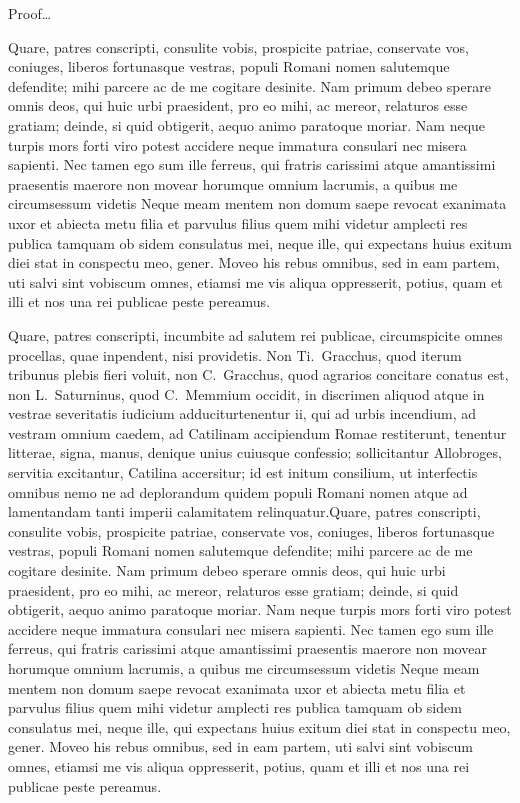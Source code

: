 \documentclass[12pt, a4paper, twoside, english]{report}
\begin{document}
	\thispagestyle{empty}
	
	Proof\dots
	
	Quare, patres conscripti, consulite vobis, prospicite patriae,
	conservate vos, coniuges, liberos fortunasque vestras, populi Romani
	nomen salutemque defendite; mihi parcere ac de me cogitare desinite. Nam
	primum debeo sperare omnis deos, qui huic urbi praesident, pro eo mihi,
	ac mereor, relaturos esse gratiam; deinde, si quid obtigerit, aequo
	animo paratoque moriar. Nam neque turpis mors forti viro potest accidere
	neque immatura consulari nec misera sapienti. Nec tamen ego sum ille
	ferreus, qui fratris carissimi atque amantissimi praesentis maerore non
	movear horumque omnium lacrumis, a quibus me circumsessum videtis Neque
	meam mentem non domum saepe revocat exanimata uxor et abiecta metu filia
	et parvulus filius quem mihi videtur amplecti res publica tamquam ob
	sidem consulatus mei, neque ille, qui expectans huius exitum diei stat
	in conspectu meo, gener. Moveo his rebus omnibus, sed in eam partem, uti
	salvi sint vobiscum omnes, etiamsi me vis aliqua oppresserit, potius,
	quam et illi et nos una rei publicae peste pereamus.
	
	Quare, patres conscripti, incumbite ad salutem rei publicae,
	circumspicite omnes procellas, quae inpendent, nisi providetis. Non
	Ti.~Gracchus, quod iterum tribunus plebis fieri voluit, non
	C.~Gracchus, quod agrarios concitare conatus est, non L.~Saturninus,
	quod C.~Memmium occidit, in discrimen aliquod atque in vestrae
	severitatis iudicium adduciturtenentur ii, qui ad urbis incendium, ad
	vestram omnium caedem, ad Catilinam accipiendum Romae restiterunt,
	tenentur litterae, signa, manus, denique unius cuiusque confessio;
	sollicitantur Allobroges, servitia excitantur, Catilina accersitur; id
	est initum consilium, ut interfectis omnibus nemo ne ad deplorandum
	quidem populi Romani nomen atque ad lamentandam tanti imperii
	calamitatem relinquatur.Quare, patres conscripti, consulite vobis, prospicite patriae,
	conservate vos, coniuges, liberos fortunasque vestras, populi Romani
	nomen salutemque defendite; mihi parcere ac de me cogitare desinite. Nam
	primum debeo sperare omnis deos, qui huic urbi praesident, pro eo mihi,
	ac mereor, relaturos esse gratiam; deinde, si quid obtigerit, aequo
	animo paratoque moriar. Nam neque turpis mors forti viro potest accidere
	neque immatura consulari nec misera sapienti. Nec tamen ego sum ille
	ferreus, qui fratris carissimi atque amantissimi praesentis maerore non
	movear horumque omnium lacrumis, a quibus me circumsessum videtis Neque
	meam mentem non domum saepe revocat exanimata uxor et abiecta metu filia
	et parvulus filius quem mihi videtur amplecti res publica tamquam ob
	sidem consulatus mei, neque ille, qui expectans huius exitum diei stat
	in conspectu meo, gener. Moveo his rebus omnibus, sed in eam partem, uti
	salvi sint vobiscum omnes, etiamsi me vis aliqua oppresserit, potius,
	quam et illi et nos una rei publicae peste pereamus.
	
\end{document}
